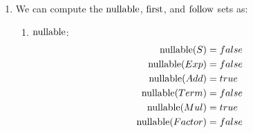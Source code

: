 \begin{exercise}{}
  \begin{solution}
    \begin{enumerate}
      \item We can compute the \(\operatorname{nullable}\), \(\operatorname{first}\), and \(\operatorname{follow}\) sets as:

        \begin{enumerate}
          \item \(\operatorname{nullable}\): 
            \begin{align*}
              \operatorname{nullable}(S) &= false \\
              \operatorname{nullable}(Exp) &= false \\
              \operatorname{nullable}(Add) &= true \\
              \operatorname{nullable}(Term) &= false \\
              \operatorname{nullable}(Mul) &= true \\
              \operatorname{nullable}(Factor) &= false
            \end{align*}


\end{enumerate}
\end{enumerate}
\end{solution}
\end{exercise}
